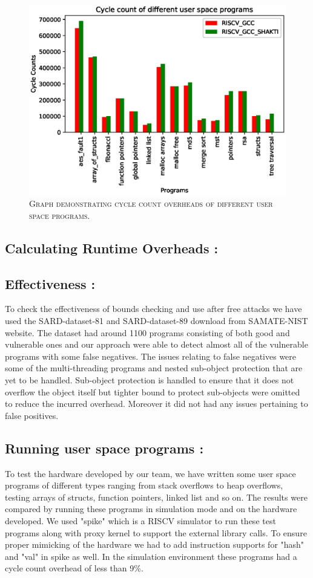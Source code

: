 \begin{figure}[h]
\centering
\includegraphics[scale=0.75]{overheads.eps}
\caption{\scshape{Graph demonstrating cycle count overheads of different user space programs. }}\label{fig:overhead}
\end{figure} 

\subsection{Calculating Runtime Overheads : }

\subsection{Effectiveness : } To check the effectiveness of bounds checking and use after free attacks we have used the SARD-dataset-81 and SARD-dataset-89 download from SAMATE-NIST\cite{SARD} website. The dataset had around 1100 programs consisting of both good and vulnerable ones and our approach were able to detect almost all of the vulnerable programs with some false negatives. The issues relating to false negatives were some of the multi-threading programs and nested sub-object protection that are yet to be handled. Sub-object protection is handled to ensure that it does not overflow the object itself but tighter bound to protect sub-objects were omitted to reduce the incurred overhead. Moreover it did not had any issues pertaining to false positives.

\subsection{Running user space programs : }
To test the hardware developed by our team, we have written some user space programs of different types ranging from stack overflows to heap overflows, testing arrays of structs, function pointers, linked list and so on. The results were compared by running these programs in simulation mode and on the hardware developed. We used "spike" which is a RISCV simulator to run these test programs along with proxy kernel to support the external library calls. To ensure proper mimicking of the hardware we had to add instruction supports for "hash" and "val" in spike as well. In the simulation environment these programs had a cycle count overhead of less than 9\%.

